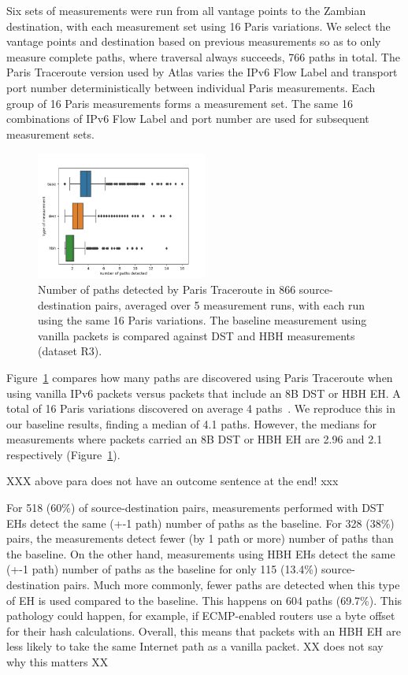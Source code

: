 \documentclass[conference]{IEEEtran}
\begin{document}
Six sets of measurements were run from all vantage points to the Zambian destination, with each measurement set using 16 Paris variations. We select the vantage points and destination based on previous measurements so as to only measure complete paths, where traversal always succeeds, 766 paths in total. The Paris Traceroute version used by Atlas varies the IPv6 Flow Label and transport port number deterministically between individual Paris measurements. Each group of 16 Paris measurements forms a measurement set. The same 16 combinations of IPv6 Flow Label and port number are used for subsequent measurement sets.

\begin{figure}
\centering
  \includegraphics[width=0.5\textwidth]{boxplot-paths-detected.png}
  \caption{Number of paths detected by Paris Traceroute in 866 source-destination pairs, averaged over 5 measurement runs, with each run using the same 16 Paris variations. The baseline measurement using vanilla packets is compared against DST and HBH measurements (dataset R3).}
  \label{fig:paths-detected}
\end{figure}

Figure~\ref{fig:paths-detected} compares how many paths are discovered using Paris Traceroute when using vanilla IPv6 packets versus packets that include an 8B DST or HBH EH.
A total of 16 Paris variations discovered on average 4 paths~\cite{augustin2006avoiding}. We reproduce this in our baseline results, finding a median of 4.1 paths. However, the medians for measurements where packets carried an 8B DST or HBH EH are 2.96 and 2.1 respectively (Figure~\ref{fig:paths-detected}).

XXX above para does not have an outcome sentence at the end! xxx

For 518 (60\%) of source-destination pairs, measurements performed with DST EHs detect the same (+-1 path) number of paths as the baseline. For 328 (38\%) pairs, the measurements detect fewer (by 1 path or more) number of paths than the baseline. On the other hand, measurements using HBH EHs detect the same (+-1 path) number of paths as the baseline for only 115 (13.4\%) source-destination pairs. Much more commonly, fewer paths are detected when this type of EH is used compared to the baseline. This happens on 604 paths (69.7\%). This pathology could happen, for example, if ECMP-enabled routers use a byte offset for their hash calculations. Overall, this means that packets with an HBH EH are less likely to take the same Internet path as a vanilla packet.
XX does not say why this matters XX
\end{document}
